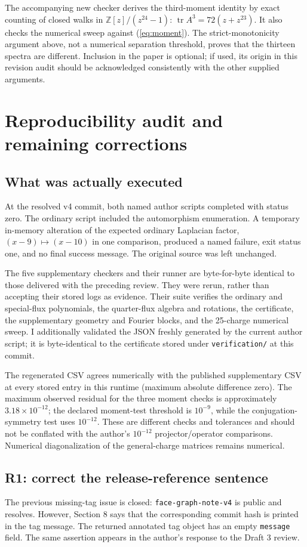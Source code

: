 \documentclass[11pt,a4paper]{article}
\newcommand{\tr}{\operatorname{tr}}
\begin{document}
The accompanying new checker derives the third-moment identity by exact counting of closed walks in $\mathbb Z[z]/(z^{24}-1)$: $\tr A^3=72(z+z^{23})$. It also checks the numerical sweep against (\ref{eq:moment}). The strict-monotonicity argument above, not a numerical separation threshold, proves that the thirteen spectra are different. Inclusion in the paper is optional; if used, its origin in this revision audit should be acknowledged consistently with the other supplied arguments.

\section{Reproducibility audit and remaining corrections}
\subsection{What was actually executed}
At the resolved v4 commit, both named author scripts completed with status zero. The ordinary script included the automorphism enumeration. A temporary in-memory alteration of the expected ordinary Laplacian factor, $(x-9)\mapsto(x-10)$ in one comparison, produced a named failure, exit status one, and no final success message. The original source was left unchanged.

The five supplementary checkers and their runner are byte-for-byte identical to those delivered with the preceding review. They were rerun, rather than accepting their stored logs as evidence. Their suite verifies the ordinary and special-flux polynomials, the quarter-flux algebra and rotations, the certificate, the supplementary geometry and Fourier blocks, and the 25-charge numerical sweep. I additionally validated the JSON freshly generated by the current author script; it is byte-identical to the certificate stored under \texttt{verification/} at this commit.

The regenerated CSV agrees numerically with the published supplementary CSV at every stored entry in this runtime (maximum absolute difference zero). The maximum observed residual for the three moment checks is approximately $3.18\times10^{-12}$; the declared moment-test threshold is $10^{-9}$, while the conjugation-symmetry test uses $10^{-12}$. These are different checks and tolerances and should not be conflated with the author's $10^{-12}$ projector/operator comparisons. Numerical diagonalization of the general-charge matrices remains numerical.

\subsection{R1: correct the release-reference sentence}
The previous missing-tag issue is closed: \texttt{face-graph-note-v4} is public and resolves. However, Section 8 says that the corresponding commit hash is printed in the tag message. The returned annotated tag object has an empty \texttt{message} field. The same assertion appears in the author's response to the Draft 3 review.
\end{document}
